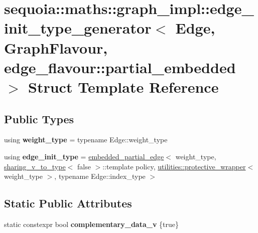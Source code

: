 \hypertarget{structsequoia_1_1maths_1_1graph__impl_1_1edge__init__type__generator_3_01_edge_00_01_graph_flavo3b993b0bac68c1627dcf2d463aaef92d}{}\section{sequoia\+::maths\+::graph\+\_\+impl\+::edge\+\_\+init\+\_\+type\+\_\+generator$<$ Edge, Graph\+Flavour, edge\+\_\+flavour\+::partial\+\_\+embedded $>$ Struct Template Reference}
\label{structsequoia_1_1maths_1_1graph__impl_1_1edge__init__type__generator_3_01_edge_00_01_graph_flavo3b993b0bac68c1627dcf2d463aaef92d}
\subsection*{Public Types}
\begin{DoxyCompactItemize}
\item 
\mbox{\label{structsequoia_1_1maths_1_1graph__impl_1_1edge__init__type__generator_3_01_edge_00_01_graph_flavo3b993b0bac68c1627dcf2d463aaef92d_a28cf889ff39ec4c5386df6ecfaa9cf9b}} 
using {\bfseries weight\+\_\+type} = typename Edge\+::weight\+\_\+type
\item 
\mbox{\label{structsequoia_1_1maths_1_1graph__impl_1_1edge__init__type__generator_3_01_edge_00_01_graph_flavo3b993b0bac68c1627dcf2d463aaef92d_af7230a7413469e9ccc798d5d00ce7b74}} 
using {\bfseries edge\+\_\+init\+\_\+type} = \mbox{\hyperlink{classsequoia_1_1maths_1_1embedded__partial__edge}{embedded\+\_\+partial\+\_\+edge}}$<$ weight\+\_\+type, \mbox{\hyperlink{structsequoia_1_1maths_1_1graph__impl_1_1sharing__v__to__type}{sharing\+\_\+v\+\_\+to\+\_\+type}}$<$ false $>$\+::template policy, \mbox{\hyperlink{classsequoia_1_1utilities_1_1protective__wrapper}{utilities\+::protective\+\_\+wrapper}}$<$ weight\+\_\+type $>$, typename Edge\+::index\+\_\+type $>$
\end{DoxyCompactItemize}
\subsection*{Static Public Attributes}
\begin{DoxyCompactItemize}
\item 
\mbox{\label{structsequoia_1_1maths_1_1graph__impl_1_1edge__init__type__generator_3_01_edge_00_01_graph_flavo3b993b0bac68c1627dcf2d463aaef92d_a1d69a80684d2608f53d24284374f3b3c}} 
static constexpr bool {\bfseries complementary\+\_\+data\+\_\+v} \{true\}
\end{DoxyCompactItemize}



